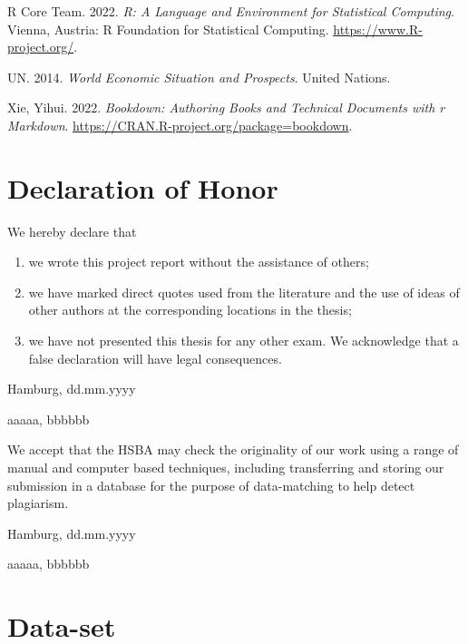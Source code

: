 \documentclass[
  11pt,
  a4paper,
  twoside]{scrbook}
\providecommand{\tightlist}{%
  \setlength{\itemsep}{0pt}\setlength{\parskip}{0pt}}
\newlength{\cslhangindent}
\newlength{\cslentryspacingunit} %
\newenvironment{CSLReferences}[2] %
 {%
  \setlength{\parindent}{0pt}
  \ifodd #1
  \let\oldpar\par
  \def\par{\hangindent=\cslhangindent\oldpar}
  \fi
    \setlength{\parskip}{#2\cslentryspacingunit+5pt}
   }%
 {}
\begin{document}
\begin{CSLReferences}{1}{0}
\leavevmode{}%
R Core Team. 2022. \emph{R: A Language and Environment for Statistical Computing}. Vienna, Austria: R Foundation for Statistical Computing. \url{https://www.R-project.org/}.

\leavevmode{}%
UN. 2014. \emph{World Economic Situation and Prospects}. United Nations.

\leavevmode{}%
Xie, Yihui. 2022. \emph{Bookdown: Authoring Books and Technical Documents with r Markdown}. \url{https://CRAN.R-project.org/package=bookdown}.

\end{CSLReferences}

\newpage

\hypertarget{declaration-of-honor}{%
\chapter*{Declaration of Honor}\label{declaration-of-honor}}

We hereby declare that

\begin{enumerate}
\def\labelenumi{\arabic{enumi}.}
\tightlist
\item
  we wrote this project report without the assistance of others;
\item
  we have marked direct quotes used from the literature and the use of ideas of other authors at the corresponding locations in the thesis;
\item
  we have not presented this thesis for any other exam. We acknowledge that a false declaration will have legal consequences.
\end{enumerate}

Hamburg, dd.mm.yyyy

aaaaa, bbbbbb

\vspace{2.5cm}

We accept that the HSBA may check the originality of our work using a range of manual and computer based techniques, including transferring and storing our submission in a database for the purpose of data-matching to help detect plagiarism.

Hamburg, dd.mm.yyyy

aaaaa, bbbbbb

\hypertarget{data-set}{%
\chapter{Data-set}\label{data-set}}
\end{document}
